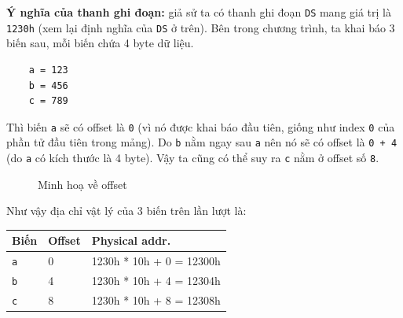 \documentclass[12pt]{report}
\newcommand{\code}[1]{\texttt{#1}}
\begin{document}
\textbf{Ý nghĩa của thanh ghi đoạn:} giả sử ta có thanh ghi đoạn \code{DS} mang giá trị là \code{1230h} (xem lại định nghĩa của \code{DS} ở trên). Bên trong chương trình, ta khai báo 3 biến sau, mỗi biến chứa 4 byte dữ liệu.
\begin{verbatim}
    a = 123
    b = 456
    c = 789
\end{verbatim}
Thì biến \code a sẽ có offset là \code 0 (vì nó được khai báo đầu tiên, giống như index \code 0 của phần tử đầu tiên trong mảng). Do \code b nằm ngay sau \code a nên nó sẽ có offset là \code{0 + 4} (do \code a có kích thước là 4 byte). Vậy ta cũng có thể suy ra \code c nằm ở offset số \code 8.

\begin{figure}[H]
    \centering
    \caption{Minh hoạ về offset}
\end{figure}

Như vậy địa chỉ vật lý của 3 biến trên lần lượt là:
\begin{table}[H]
    \centering
    \begin{tabular}{|l|l|l|}
    \hline
    Biến        & Offset    & Physical addr.          \\
    \hline
    \code{a}    & 0         & 1230h * 10h + 0 = 12300h \\
    \code{b}    & 4         & 1230h * 10h + 4 = 12304h \\
    \code{c}    & 8         & 1230h * 10h + 8 = 12308h \\
    \hline
    \end{tabular}
\end{table}
\end{document}
